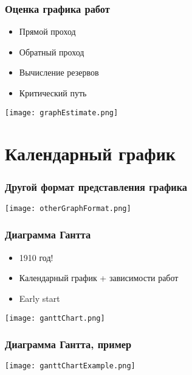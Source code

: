 \documentclass{../../slides-style}
\begin{document}
    \begin{frame}
        \frametitle{Оценка графика работ}
        \begin{itemize}
            \item Прямой проход
            \item Обратный проход
            \item Вычисление резервов
            \item Критический путь
        \end{itemize}
        \begin{center}
            \texttt{[image: graphEstimate.png]}
        \end{center}
    \end{frame}

    \section{Календарный график}

    \begin{frame}
        \frametitle{Другой формат представления графика}
        \begin{center}
            \texttt{[image: otherGraphFormat.png]}
        \end{center}
    \end{frame}

    \begin{frame}
        \frametitle{Диаграмма Гантта}
        \begin{itemize}
            \item 1910 год!
            \item Календарный график + зависимости работ
            \item Early start
        \end{itemize}
        \begin{center}
            \texttt{[image: ganttChart.png]}
        \end{center}
    \end{frame}

    \begin{frame}
        \frametitle{Диаграмма Гантта, пример}
        \begin{center}
            \texttt{[image: ganttChartExample.png]}
        \end{center}
    \end{frame}
\end{document}
